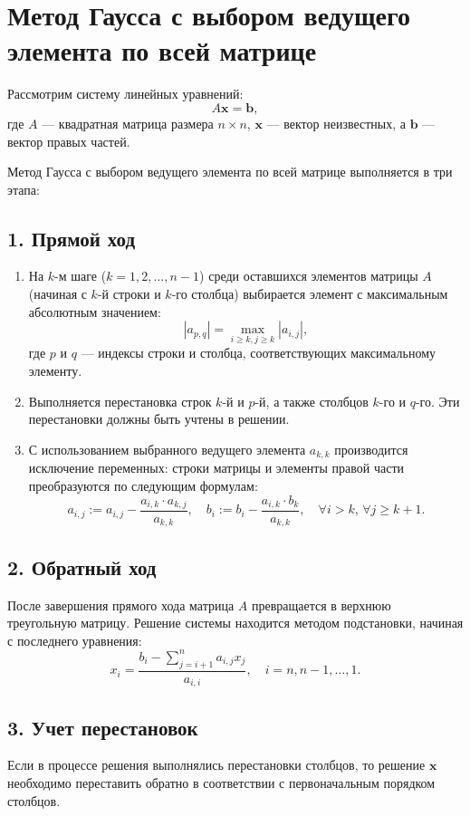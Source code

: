 \documentclass[a4paper,12pt]{article}
\begin{document}
	\section*{Метод Гаусса с выбором ведущего элемента по всей матрице}
	Рассмотрим систему линейных уравнений:
	\[
	A \mathbf{x} = \mathbf{b},
	\]
	где \(A\) — квадратная матрица размера \(n \times n\), \(\mathbf{x}\) — вектор неизвестных, а \(\mathbf{b}\) — вектор правых частей.
	
	Метод Гаусса с выбором ведущего элемента по всей матрице выполняется в три этапа:
	
	\subsection*{1. Прямой ход}
	\begin{enumerate}
		\item На \(k\)-м шаге (\(k = 1, 2, \dots, n-1\)) среди оставшихся элементов матрицы \(A\) (начиная с \(k\)-й строки и \(k\)-го столбца) выбирается элемент с максимальным абсолютным значением:
		\[
		|a_{p,q}| = \max\limits_{i \geq k, j \geq k} |a_{i,j}|,
		\]
		где \(p\) и \(q\) — индексы строки и столбца, соответствующих максимальному элементу.
		
		\item Выполняется перестановка строк \(k\)-й и \(p\)-й, а также столбцов \(k\)-го и \(q\)-го. Эти перестановки должны быть учтены в решении.
		
		\item С использованием выбранного ведущего элемента \(a_{k,k}\) производится исключение переменных: строки матрицы и элементы правой части преобразуются по следующим формулам:
		\[
		a_{i,j} := a_{i,j} - \frac{a_{i,k} \cdot a_{k,j}}{a_{k,k}}, \quad b_i := b_i - \frac{a_{i,k} \cdot b_k}{a_{k,k}}, \quad \forall i > k, \, \forall j \geq k+1.
		\]
	\end{enumerate}
	
	\subsection*{2. Обратный ход}
	После завершения прямого хода матрица \(A\) превращается в верхнюю треугольную матрицу. Решение системы находится методом подстановки, начиная с последнего уравнения:
	\[
	x_i = \frac{b_i - \sum_{j=i+1}^{n} a_{i,j} x_j}{a_{i,i}}, \quad i = n, n-1, \dots, 1.
	\]
	
	\subsection*{3. Учет перестановок}
	Если в процессе решения выполнялись перестановки столбцов, то решение \(\mathbf{x}\) необходимо переставить обратно в соответствии с первоначальным порядком столбцов.
	\newpage
\end{document}
